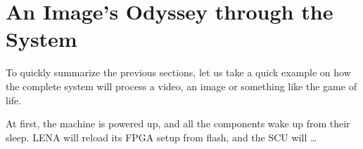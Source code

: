 \section{An Image's Odyssey through the System}

To quickly summarize the previous sections, let us take a quick example on how
the complete system will process a video, an image or something like the game of
life.

At first, the machine is powered up, and all the components wake up from their
sleep. LENA will reload its FPGA setup from flash, and the SCU will \ldots


